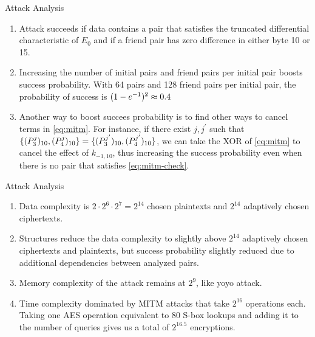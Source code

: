 \documentclass[notheorems]{beamer}
\theoremstyle{definition}
\theoremstyle{example}
\begin{document}
    \begin{frame}[<+->]{Attack Analysis}
        \begin{enumerate}
            \item Attack succeeds if data contains a pair that satisfies the
            truncated differential characteristic of \(E_0\) and if a friend
            pair has zero difference in either byte 10 or 15.
            \item Increasing the number of initial pairs and friend pairs per
            initial pair boosts success probability. With 64 pairs and 128
            friend pairs per initial pair, the probability of success is
            \((1 - e^{-1})^2 \approx 0.4\)
            \item Another way to boost succees probability is to find other ways
            to cancel terms in \eqref{eq:mitm}. For instance, if there exist
            \(j, j^\prime\) such that \(\{(P_3^j)_{10},
            (P_4^j)_{10}\} = \{(P_3^{j^\prime})_{10},
            (P_4^{j^\prime})_{10}\}\), we can take the XOR of
            \eqref{eq:mitm} to cancel the effect of \(k_{-1, 10}\), thus
            increasing the success probability even when there is no pair that
            satisfies \eqref{eq:mitm-check}.
            \seti
        \end{enumerate} 
    \end{frame}

    \begin{frame}[<+->]{Attack Analysis}
        \begin{enumerate}
            \conti
            \item Data complexity is \(2 \cdot 2^6 \cdot 2^7 = 2^{14}\) chosen
            plaintexts and \(2^{14}\) adaptively chosen ciphertexts.
            \item Structures reduce the data complexity to slightly above
            \(2^{14}\) adaptively chosen ciphertexts and plaintexts, but success
            probability slightly reduced due to additional dependencies between
            analyzed pairs.
            \item Memory complexity of the attack remains at \(2^9\), like yoyo
            attack.
            \item Time complexity dominated by MITM attacks that take \(2^{16}\)
            operations each. Taking one AES operation equivalent to 80 S-box
            lookups and adding it to the number of queries gives us a total of
            \(2^{16.5}\) encryptions.
        \end{enumerate} 
    \end{frame}
\end{document}
